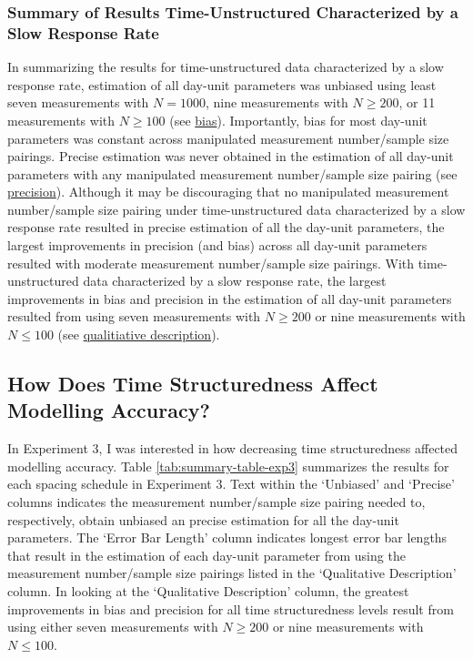 \documentclass[
12pt, %
twoside,
english]{guelphthesis}
\begin{document}
\hypertarget{summary-of-results-time-unstructured-characterized-by-a-slow-response-rate}{%
\subsubsection{Summary of Results Time-Unstructured Characterized by a Slow Response Rate}\label{summary-of-results-time-unstructured-characterized-by-a-slow-response-rate}}

In summarizing the results for time-unstructured data characterized by a slow response rate, estimation of all day-unit parameters was unbiased using least seven measurements with \(N = 1000\), nine measurements with \(N \ge 200\), or 11 measurements with \(N \ge 100\) (see \protect\hyperlink{bias-slow-exp3}{bias}). Importantly, bias for most day-unit parameters was constant across manipulated measurement number/sample size pairings. Precise estimation was never obtained in the estimation of all day-unit parameters with any manipulated measurement number/sample size pairing (see \protect\hyperlink{precision-slow-exp3}{precision}). Although it may be discouraging that no manipulated measurement number/sample size pairing under time-unstructured data characterized by a slow response rate resulted in precise estimation of all the day-unit parameters, the largest improvements in precision (and bias) across all day-unit parameters resulted with moderate measurement number/sample size pairings. With time-unstructured data characterized by a slow response rate, the largest improvements in bias and precision in the estimation of all day-unit parameters resulted from using seven measurements with \(N \ge 200\) or nine measurements with \(N \le 100\) (see \protect\hyperlink{qualitative-slow-exp3}{qualitiative description}).

\hypertarget{how-does-time-structuredness-affect-modelling-accuracy}{%
\subsection{How Does Time Structuredness Affect Modelling Accuracy?}\label{how-does-time-structuredness-affect-modelling-accuracy}}

In Experiment 3, I was interested in how decreasing time structuredness affected modelling accuracy. Table \ref{tab:summary-table-exp3} summarizes the results for each spacing schedule in Experiment 3. Text within the `Unbiased' and `Precise' columns indicates the measurement number/sample size pairing needed to, respectively, obtain unbiased an precise estimation for all the day-unit parameters. The `Error Bar Length' column indicates longest error bar lengths that result in the estimation of each day-unit parameter from using the measurement number/sample size pairings listed in the `Qualitative Description' column. In looking at the `Qualitative Description' column, the greatest improvements in bias and precision for all time structuredness levels result from using either seven measurements with \(N \ge 200\) or nine measurements with \(N \le 100\).
\end{document}
